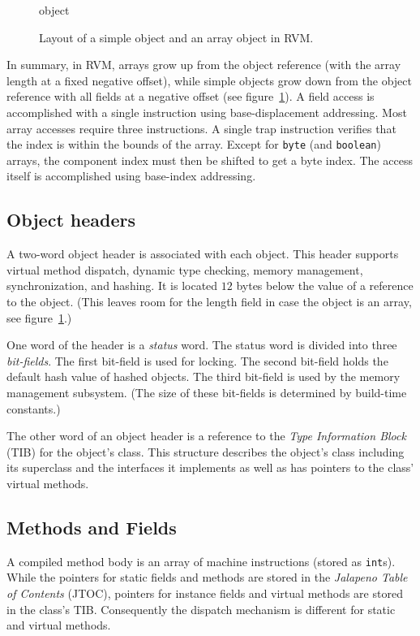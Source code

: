 \begin{figure}[htb]
\begin{gif}{object}
\vbox{
\hbox{}
}\hfil
\end{gif}
\caption{Layout of a simple object and an array object in RVM.}
\label{fig:objects}
\end{figure}

In summary, in RVM, arrays grow up from the object reference (with the
array length at a fixed negative offset), while simple objects grow
down from the object reference with all fields at a negative offset
(see figure~\ref{fig:objects}).  A field access is accomplished with a
single instruction using base-displacement addressing.  Most array
accesses require three instructions.  A single trap instruction
verifies that the index is within the bounds of the array.  Except for
{\tt byte} (and {\tt boolean}) arrays, the component index must then
be shifted to get a byte index.  The access itself is accomplished
using base-index addressing.

\subsection{Object headers} \label{sssec:headers}
A two-word object header is associated with each object.  This header
supports virtual method dispatch, dynamic type checking, memory
management, synchronization, and hashing.  It is located $12$ bytes
below the value of a reference to the object.  (This leaves room for
the length field in case the object is an array, see
figure~\ref{fig:objects}.)

One word of the header is a {\em status} word.  The status word is
divided into three {\em bit-fields}.  The first bit-field is used for
locking.  The second bit-field holds
the default hash value of hashed objects.  The third bit-field is used
by the memory management subsystem.  (The size of these bit-fields is
determined by build-time constants.)

The other word of an object header is a reference to the {\em Type
Information Block} (TIB) for the object's class. This structure describes
the object's class including its superclass and the interfaces it implements
as well as has pointers to the class' virtual methods.

\subsection{Methods and Fields}\label{sssec:methods}
A compiled method body is an array of machine instructions (stored as
{\tt int}s). 
While the pointers for static fields and methods are stored in the 
{\em Jalapeno Table of Contents} (JTOC),
pointers for instance fields and virtual methods are stored in the class's TIB.
Consequently the dispatch mechanism is different for static and virtual 
methods.

